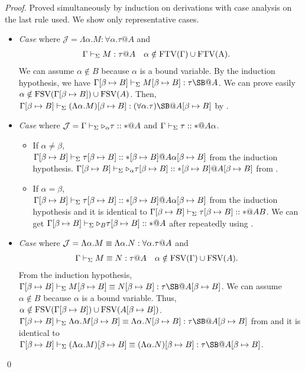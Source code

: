 \begin{proof}
	Proved simultaneously by induction on derivations with case analysis on the last rule used.
	We show only representative cases.
	\begin{itemize}
								
		\newcommand{\SB}{[\beta \mapsto B]}
		\newcommand{\GG}{\G\SB}
		\newcommand{\GGV}{\G\SB \V}
				
		\item \textit{Case} \TGen{} where $\mathcal{J} = \Lambda\alpha.M:\forall\alpha.\tau@A$ and
		      \begin{align*}
		      	  & \G\V M:\tau@A &   & \alpha\notin\rm{FTV}(\G)\cup\rm{FTV}(A). 
		      \end{align*}
		      We can assume $\alpha \notin B$ because $\alpha$ is a bound variable.
		      By the induction hypothesis, we have \(\G\SB\V M\SB:\tau\SB@A\).
		      We can prove easily $\alpha \notin \FTV(\GG) \cup \FTV(A)$.
		      Then, \(\GGV (\Lambda\alpha.M)\SB:(\forall\alpha.\tau)\SB@A\SB\) by \TGen.
		      		      
		\item \textit{Case} \KTW{} where \(\mathcal{J} = \Gamma\vdash_\Sigma {\mathop{\triangleright}}_\alpha \tau :: * @ A \) and \( \Gamma\vdash_\Sigma \tau :: * @ A\alpha \).
		      \begin{itemize}
		      	\item If $\alpha \neq \beta$,\\
		      	      \( \GGV \tau\SB :: *\SB @ A\alpha\SB \) from the induction hypothesis.
		      	      \( \GGV \TW_\alpha \tau\SB :: *\SB @ A\SB \) from \KTW.
		      	      	      	      	      	      	      	      	      	      	     	      
		      	\item If $\alpha = \beta$, \\
		      	      \( \GGV \tau\SB :: *\SB @ A\alpha\SB \) from the induction hypothesis and
		      	      it is identical to \( \GGV \tau\SB :: * @ AB \).
		      	      We can get \( \GGV \TW_B \tau\SB :: * @ A \) after repeatedly using \KTW{}.
		      	      
		      \end{itemize}
		      		
		\item \textit{Case} \QGen{} where \(\mathcal{J} = \Lambda\alpha.M \E \Lambda\alpha.N : \forall\alpha.\tau@A\) and 
		      \begin{align*}
		      	  & \G\V M\E N : \tau@A &   & \alpha \notin \FTV(\G)\cup\FTV(A). 
		      \end{align*}
		      From the induction hypothesis, \( \GGV M\SB \E N\SB : \tau\SB@A\SB \).
		      We can assume \(\alpha \notin B \) because \(\alpha\) is a bound variable.
		      Thus, \( \alpha \notin \FTV(\G\SB)\cup\FTV(A\SB) \).
		      \( \GGV \Lambda\alpha.M\SB \E \Lambda\alpha.N\SB : \tau\SB@A\SB \) from \QGen{} and
		      it is identical to \( \GGV (\Lambda\alpha.M)\SB \E (\Lambda\alpha.N)\SB : \tau\SB@A\SB \).
		      		      
	\end{itemize}
\qed\end{proof}

